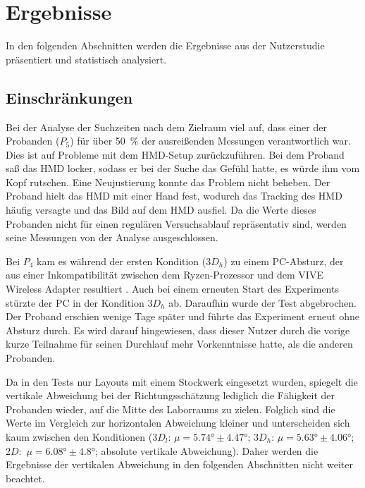 \section{Ergebnisse}
In den folgenden Abschnitten werden die Ergebnisse aus der Nutzerstudie präsentiert und statistisch analysiert.

\subsection*{Einschränkungen}
Bei der Analyse der Suchzeiten nach dem Zielraum viel auf, dass einer der Probanden ($P_5$) für über \SI{50}{\percent} der ausreißenden Messungen verantwortlich war.
Dies ist auf Probleme mit dem HMD-Setup zurückzuführen.
Bei dem Proband saß das HMD locker, sodass er bei der Suche das Gefühl hatte, es würde ihm vom Kopf rutschen.
Eine Neujustierung konnte das Problem nicht beheben.
Der Proband hielt das HMD mit einer Hand fest, wodurch das Tracking des HMD häufig versagte und das Bild auf dem HMD ausfiel.
Da die Werte dieses Probanden nicht für einen regulären Versuchsablauf repräsentativ sind, werden seine Messungen von der Analyse ausgeschlossen.

Bei $P_4$ kam es während der ersten Kondition ($3D_h$) zu einem PC-Absturz, der aus einer Inkompatibilität zwischen dem Ryzen-Prozessor und dem VIVE Wireless Adapter resultiert \parencite{HTCCorporation2018c}.
Auch bei einem erneuten Start des Experiments stürzte der PC in der Kondition $3D_h$ ab.
Daraufhin wurde der Test abgebrochen.
Der Proband erschien wenige Tage später und führte das Experiment erneut ohne Absturz durch.
Es wird darauf hingewiesen, dass dieser Nutzer durch die vorige kurze Teilnahme für seinen Durchlauf mehr Vorkenntnisse hatte, als die anderen Probanden.

Da in den Tests nur Layouts mit einem Stockwerk eingesetzt wurden, spiegelt die vertikale Abweichung bei der Richtungsschätzung lediglich die Fähigkeit der Probanden wieder, auf die Mitte des Laborraums zu zielen.
Folglich sind die Werte im Vergleich zur horizontalen Abweichung kleiner und unterscheiden sich kaum zwischen den Konditionen ($3D_l$: $\mu = \ang{5,74} \pm \ang{4,47}$; $3D_h$: $\mu = \ang{5,63} \pm \ang{4,06}$; $2D:$ $\mu = \ang{6,08} \pm \ang{4,8}$; absolute vertikale Abweichung).
Daher werden die Ergebnisse der vertikalen Abweichung in den folgenden Abschnitten nicht weiter beachtet.

